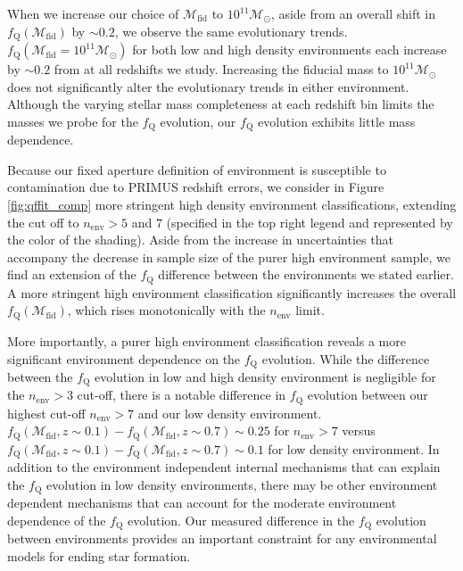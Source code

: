 \documentclass{aastex}
\begin{document}
When we increase our choice of $\mathcal{M}_{\mathrm{fid}}$ to $10^{11}
\mathcal{M}_\odot$, aside from an overall shift in
$f_{\mathrm{Q}}(\mathcal{M}_{\mathrm{fid}})$ by $\sim 0.2$, we observe the
same evolutionary trends. $f_{\mathrm{Q}}(\mathcal{M}_{\mathrm{fid}} =
10^{11}\mathcal{M}_{\odot})$ for both low and high density
environments each increase by $\sim 0.2$ from at all redshifts we
study. Increasing the fiducial mass to $10^{11}
\mathcal{M}_{\odot}$ does not significantly alter the evolutionary
trends in either environment. Although the varying stellar mass
completeness at each redshift bin limits the masses we probe for the
$f_{\mathrm{Q}}$ evolution, our $f_{\mathrm{Q}}$ evolution exhibits little
mass dependence.

Because our fixed aperture definition of environment is susceptible to
contamination due to PRIMUS redshift errors, we consider in Figure
\ref{fig:qffit_comp} more stringent high density environment
classifications, extending the cut off to $n_{\mathrm{env}} > 5$ and
$7$ (specified in the top right legend and represented by the color of
the shading). Aside from the increase in uncertainties that accompany
the decrease in sample size of the purer high environment sample, we
find an extension of the $f_{\mathrm{Q}}$ difference between the
environments we stated earlier. A more stringent high environment
classification significantly increases the overall
$f_{\mathrm{Q}}(\mathcal{M}_{\mathrm{fid}})$, which rises monotonically with
the $n_{\mathrm{env}}$ limit.

More importantly, a purer high environment classification reveals a
more significant environment dependence on the $f_{\mathrm{Q}}$
evolution. While the difference between the $f_{\mathrm{Q}}$ evolution in
low and high density environment is negligible for the $n_{\mathrm{env}} >
3$ cut-off, there is a notable difference in $f_{\mathrm{Q}}$
evolution between our highest cut-off $n_{\mathrm{env}} > 7$ and our low
density environment. $f_{\mathrm{Q}}(\mathcal{M}_{\mathrm{fid}}, z
\sim 0.1) - f_{\mathrm{Q}}(\mathcal{M}_{\mathrm{fid}}, z \sim 0.7)
\sim 0.25$ for $n_{\mathrm{env}} > 7$ versus
$f_{\mathrm{Q}}(\mathcal{M}_{\mathrm{fid}}, z \sim 0.1) -
f_{\mathrm{Q}}(\mathcal{M}_{\mathrm{fid}}, z \sim 0.7) \sim 0.1$ for
low density environment. In addition to the
environment independent internal mechanisms that can explain the
$f_{\mathrm{Q}}$ evolution in low density environments, there may be other
environment dependent mechanisms that can account for the moderate
environment dependence of the $f_{\mathrm{Q}}$ evolution. Our measured
difference in the $f_{\mathrm{Q}}$ evolution between environments provides
an important constraint for any environmental models for ending star
formation.
\end{document}
